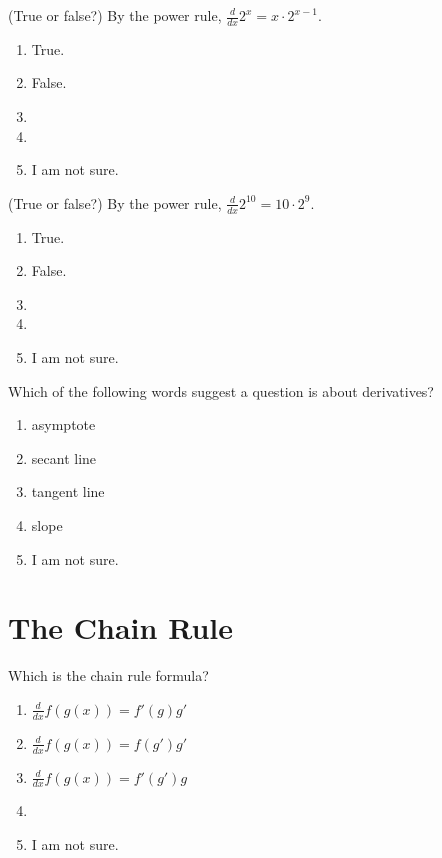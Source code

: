 \documentclass[14pt]{beamer}
\begin{document}
\begin{frame}
  (True or false?) By the power rule, \(\frac{d}{dx} 2^{x} = x \cdot 2^{x-1}\).

  \medskip
  \begin{enumerate} 
    \item True.
    \item False.
    \item 
    \item 
    \item I am not sure.
  \end{enumerate} 
\end{frame}


\begin{frame}
  (True or false?) By the power rule, \(\frac{d}{dx} 2^{10} = 10 \cdot 2^{9}\).

  \medskip
  \begin{enumerate} 
    \item True.
    \item False.
    \item 
    \item 
    \item I am not sure.
  \end{enumerate} 
\end{frame}


\begin{frame}
  Which of the following words suggest a question is about derivatives?

  \medskip
  \begin{enumerate} 
    \item asymptote
    \item secant line
    \item tangent line
    \item slope
    \item I am not sure.
  \end{enumerate} 
\end{frame}


\section{The Chain Rule}
\begin{frame}
  Which is the chain rule formula?

  \medskip
  \begin{enumerate} 
    \item \(\tfrac{d}{dx} f(g(x)) = f'(g)g'\)
    \item \(\tfrac{d}{dx} f(g(x)) = f(g')g'\)
    \item \(\tfrac{d}{dx} f(g(x)) = f'(g')g\)
    \item 
    \item I am not sure.
  \end{enumerate} 
\end{frame}
\end{document}
